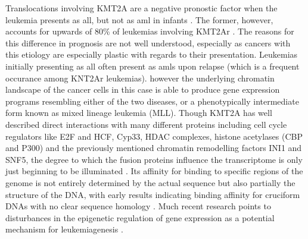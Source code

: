 
Translocations involving KMT2A are a negative pronostic factor when the leukemia presents as \gls{all}, but not as \gls{aml} in infants \cite{Meyer2014}. The former, however, accounts for upwards of 80\% of leukemias involving KMT2Ar \cite{Rice2020}. The reasons for this difference in prognosis are not well understood, especially as cancers with this etiology are especially plastic with regards to their presentation. Leukemias initially presenting as \gls{all} often present as \glspl{aml} upon relapse (which is a frequent occurance among KNT2Ar leukemias).  however the underlying chromatin landscape of the cancer cells in this case is able to produce gene expression programs resembling either of the two diseases, or a phenotypically intermediate form known as mixed lineage leukemia (MLL). Though KMT2A has well described direct interactions with many different proteins including cell cycle regulators like E2F and HCF, Cyp33, HDAC complexes, histone acetylases (CBP and P300) and the previously mentioned chromatin remodelling factors INI1 and SNF5, the degree to which the fusion proteins influence the transcriptome is only just beginning to be illuminated \cite{Sugeedha2021}. Its affinity for binding to specific regions of the genome is not entirely determined by the actual sequence but also partially the structure of the DNA, with early results indicating binding affinity for cruciform DNAs with no clear sequence homology \cite{NJ1994}. Much recent research points to disturbances in the epigenetic regulation of gene expression as a potential mechanism for leukemiagenesis \cite{Krivtsov2007}.

